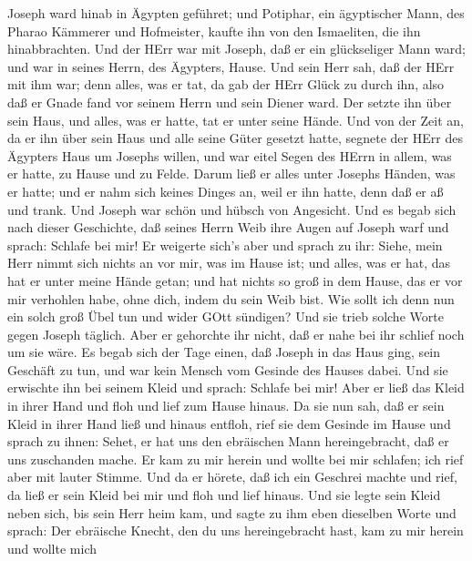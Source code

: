  Joseph ward hinab in Ägypten geführet; und Potiphar, ein
ägyptischer Mann, des Pharao Kämmerer und Hofmeister, kaufte ihn von den
Ismaeliten, die ihn hinabbrachten.  Und der HErr war mit
Joseph, daß er ein glückseliger Mann ward; und war in seines Herrn, des
Ägypters, Hause.  Und sein Herr sah, daß der HErr mit ihm
war; denn alles, was er tat, da gab der HErr Glück zu durch ihn,
 also daß er Gnade fand vor seinem Herrn und sein Diener
ward. Der setzte ihn über sein Haus, und alles, was er hatte, tat er
unter seine Hände.  Und von der Zeit an, da er ihn über sein
Haus und alle seine Güter gesetzt hatte, segnete der HErr des Ägypters
Haus um Josephs willen, und war eitel Segen des HErrn in allem, was er
hatte, zu Hause und zu Felde.  Darum ließ er alles unter
Josephs Händen, was er hatte; und er nahm sich keines Dinges an, weil er
ihn hatte, denn daß er aß und trank. Und Joseph war schön und hübsch von
Angesicht.  Und es begab sich nach dieser Geschichte, daß
seines Herrn Weib ihre Augen auf Joseph warf und sprach: Schlafe bei
mir!  Er weigerte sich's aber und sprach zu ihr: Siehe, mein
Herr nimmt sich nichts an vor mir, was im Hause ist; und alles, was er
hat, das hat er unter meine Hände getan;  und hat nichts so
groß in dem Hause, das er vor mir verhohlen habe, ohne dich, indem du
sein Weib bist. Wie sollt ich denn nun ein solch groß Übel tun und wider
GOtt sündigen?  Und sie trieb solche Worte gegen Joseph
täglich. Aber er gehorchte ihr nicht, daß er nahe bei ihr schlief noch
um sie wäre.  Es begab sich der Tage einen, daß Joseph in
das Haus ging, sein Geschäft zu tun, und war kein Mensch vom Gesinde des
Hauses dabei.  Und sie erwischte ihn bei seinem Kleid und
sprach: Schlafe bei mir! Aber er ließ das Kleid in ihrer Hand und floh
und lief zum Hause hinaus.  Da sie nun sah, daß er sein
Kleid in ihrer Hand ließ und hinaus entfloh,  rief sie dem
Gesinde im Hause und sprach zu ihnen: Sehet, er hat uns den ebräischen
Mann hereingebracht, daß er uns zuschanden mache. Er kam zu mir herein
und wollte bei mir schlafen; ich rief aber mit lauter Stimme.
 Und da er hörete, daß ich ein Geschrei machte und rief, da
ließ er sein Kleid bei mir und floh und lief hinaus.  Und
sie legte sein Kleid neben sich, bis sein Herr heim kam, 
und sagte zu ihm eben dieselben Worte und sprach: Der ebräische Knecht,
den du uns hereingebracht hast, kam zu mir herein und wollte mich
